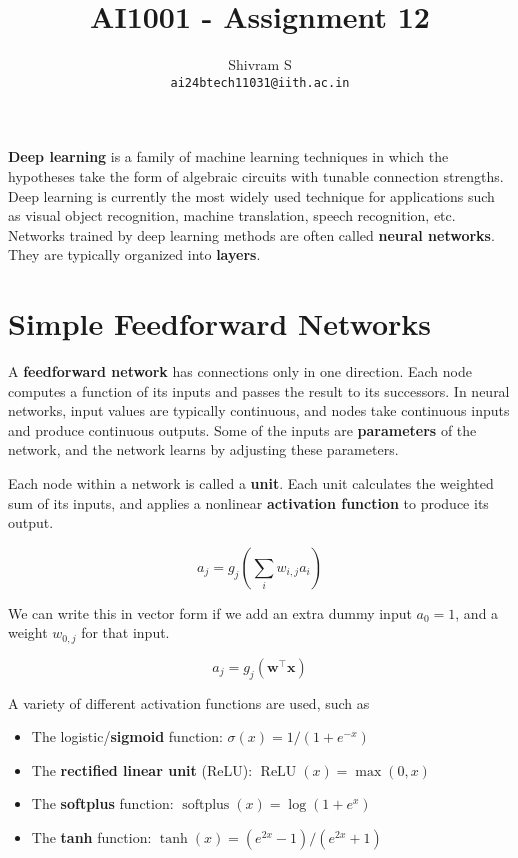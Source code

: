 \documentclass{article}
\author{Shivram S \\ \texttt{ai24btech11031@iith.ac.in}}
\title{AI1001 - Assignment 12}
\DeclareMathOperator*{\softplus}{softplus}
\DeclareMathOperator*{\ReLU}{ReLU}
\begin{document}
\maketitle

\textbf{Deep learning} is a family of machine learning techniques in which the
hypotheses take the form of algebraic circuits with tunable connection strengths.
Deep learning is currently the most widely used technique for applications such
as visual object recognition, machine translation, speech recognition, etc.
Networks trained by deep learning methods are often called \textbf{neural networks}.
They are typically organized into \textbf{layers}.

\section{Simple Feedforward Networks}

A \textbf{feedforward network} has connections only in one direction. Each node
computes a function of its inputs and passes the result to its successors. In neural
networks, input values are typically continuous, and nodes take continuous inputs
and produce continuous outputs. Some of the inputs are \textbf{parameters} of the 
network, and the network learns by adjusting these parameters.

Each node within a network is called a \textbf{unit}. Each unit calculates the
weighted sum of its inputs, and applies a nonlinear \textbf{activation function}
to produce its output.

\[
a_j = g_j (\sum_i w_{i,j} a_i)
\]

We can write this in vector form if we add an extra dummy input $a_0 = 1$, and a weight
$w_{0,j}$ for that input.

\[
a_j = g_j (\textbf{w}^\top \textbf{x})
\]

A variety of different activation functions are used, such as 

\begin{itemize}
    \item The logistic/\textbf{sigmoid} function: $\sigma(x) = 1 / (1 + e^{-x})$
    \item The \textbf{rectified linear unit} (ReLU): $\ReLU(x) = \max(0, x)$
    \item The \textbf{softplus} function: $\softplus(x) = \log(1 + e^x)$
    \item The \textbf{tanh} function: $\tanh(x) = (e^{2x} - 1) / (e^{2x} + 1)$
\end{itemize}
\end{document}
